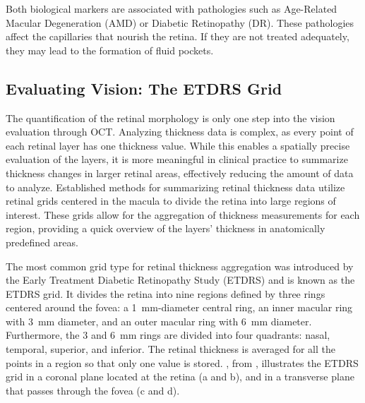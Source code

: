 Both biological markers are associated with pathologies such as Age-Related Macular Degeneration (AMD) or Diabetic Retinopathy (DR). These pathologies affect the capillaries that nourish the retina. If they are not treated adequately, they may lead to the formation of fluid pockets.

\subsection{Evaluating Vision: The ETDRS Grid}
The quantification of the retinal morphology is only one step into the vision evaluation through OCT. Analyzing thickness data is complex, as every point of each retinal layer has one thickness value. While this enables a spatially precise evaluation of the layers, it is more meaningful in clinical practice to summarize thickness changes in larger retinal areas, effectively reducing the amount of data to analyze. Established methods for summarizing retinal thickness data utilize retinal grids centered in the macula to divide the retina into large regions of interest. These grids allow for the aggregation of thickness measurements for each region, providing a quick overview of the layers' thickness in anatomically predefined areas. 

The most common grid type for retinal thickness aggregation was introduced by the Early Treatment Diabetic Retinopathy Study (ETDRS) and is known as the ETDRS grid. It divides the retina into nine regions defined by three rings centered around the fovea: a \qty{1}{\milli\metre}-diameter central ring, an inner macular ring with \qty{3}{\milli\metre} diameter, and an outer macular ring with \qty{6}{\milli\metre} diameter. Furthermore, the 3 and \qty{6}{\milli\metre} rings are divided into four quadrants: nasal, temporal, superior, and inferior. The retinal thickness is averaged for all the points in a region so that only one value is stored. , from , illustrates the ETDRS grid in a coronal plane located at the retina (a and b), and in a transverse plane that passes through the fovea (c and d). 


